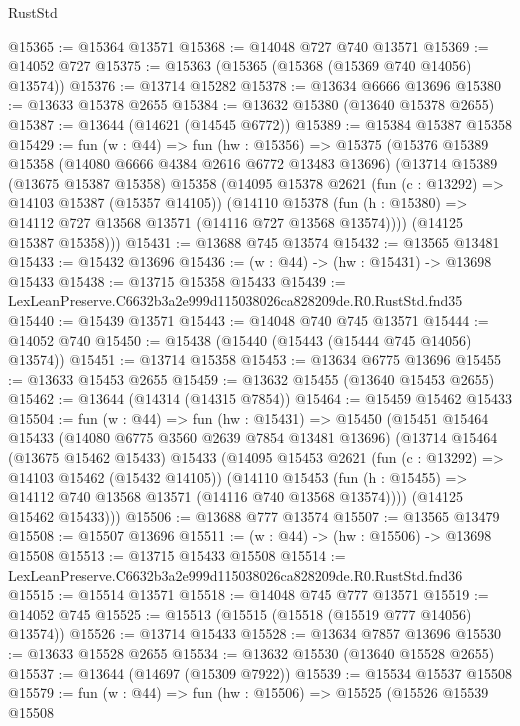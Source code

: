\begin{lexlean}{RustStd}
\begin{coremodule}
@15365 := @15364 @13571
@15368 := @14048 @727 @740 @13571
@15369 := @14052 @727
@15375 := @15363 (@15365 (@15368 (@15369 @740 @14056) @13574))
@15376 := @13714 @15282
@15378 := @13634 @6666 @13696
@15380 := @13633 @15378 @2655
@15384 := @13632 @15380 (@13640 @15378 @2655)
@15387 := @13644 (@14621 (@14545 @6772))
@15389 := @15384 @15387 @15358
@15429 := fun (w : @44) =>
  fun (hw : @15356) =>
  @15375
    (@15376
      @15389
      @15358
      (@14080 @6666 @4384 @2616 @6772 @13483 @13696)
      (@13714
        @15389
        (@13675 @15387 @15358)
        @15358
        (@14095
          @15378
          @2621
          (fun (c : @13292) => @14103 @15387 (@15357 @14105))
          (@14110
            @15378
            (fun (h : @15380) => @14112 @727 @13568 @13571 (@14116 @727 @13568 @13574))))
        (@14125 @15387 @15358)))
@15431 := @13688 @745 @13574
@15432 := @13565 @13481
@15433 := @15432 @13696
@15436 := (w : @44) -> (hw : @15431) -> @13698 @15433
@15438 := @13715 @15358 @15433
@15439 := LexLeanPreserve.C6632b3a2e999d115038026ca828209de.R0.RustStd.fnd35
@15440 := @15439 @13571
@15443 := @14048 @740 @745 @13571
@15444 := @14052 @740
@15450 := @15438 (@15440 (@15443 (@15444 @745 @14056) @13574))
@15451 := @13714 @15358
@15453 := @13634 @6775 @13696
@15455 := @13633 @15453 @2655
@15459 := @13632 @15455 (@13640 @15453 @2655)
@15462 := @13644 (@14314 (@14315 @7854))
@15464 := @15459 @15462 @15433
@15504 := fun (w : @44) =>
  fun (hw : @15431) =>
  @15450
    (@15451
      @15464
      @15433
      (@14080 @6775 @3560 @2639 @7854 @13481 @13696)
      (@13714
        @15464
        (@13675 @15462 @15433)
        @15433
        (@14095
          @15453
          @2621
          (fun (c : @13292) => @14103 @15462 (@15432 @14105))
          (@14110
            @15453
            (fun (h : @15455) => @14112 @740 @13568 @13571 (@14116 @740 @13568 @13574))))
        (@14125 @15462 @15433)))
@15506 := @13688 @777 @13574
@15507 := @13565 @13479
@15508 := @15507 @13696
@15511 := (w : @44) -> (hw : @15506) -> @13698 @15508
@15513 := @13715 @15433 @15508
@15514 := LexLeanPreserve.C6632b3a2e999d115038026ca828209de.R0.RustStd.fnd36
@15515 := @15514 @13571
@15518 := @14048 @745 @777 @13571
@15519 := @14052 @745
@15525 := @15513 (@15515 (@15518 (@15519 @777 @14056) @13574))
@15526 := @13714 @15433
@15528 := @13634 @7857 @13696
@15530 := @13633 @15528 @2655
@15534 := @13632 @15530 (@13640 @15528 @2655)
@15537 := @13644 (@14697 (@15309 @7922))
@15539 := @15534 @15537 @15508
@15579 := fun (w : @44) =>
  fun (hw : @15506) =>
  @15525
    (@15526
      @15539
      @15508

\end{coremodule}
\end{lexlean}
